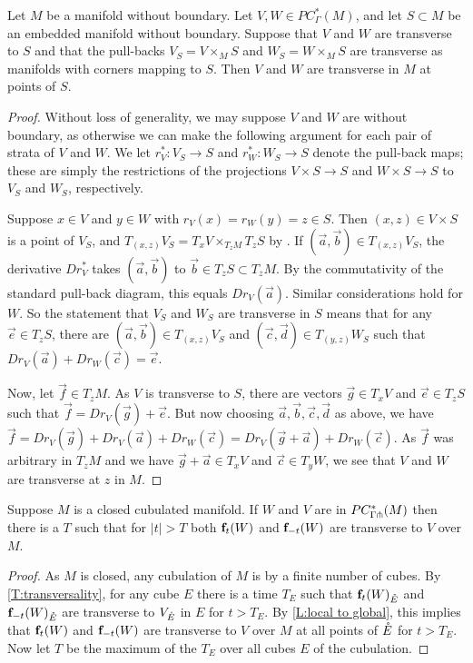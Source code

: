 \begin{lemma}\label{L:local to global}
	Let $M$ be a manifold without boundary.
	Let $V, W \in PC^*_\Gamma(M)$, and let $S \subset M$ be an embedded manifold without boundary.
	Suppose that $V$ and $W$ are transverse to $S$ and that the pull-backs $V_S = V \times_M S$ and $W_S = W \times_M S$ are transverse as manifolds with corners mapping to $S$.
	Then $V$ and $W$ are transverse in $M$ at points of $S$.
\end{lemma}
\begin{proof}
	Without loss of generality, we may suppose $V$ and $W$ are without boundary, as otherwise we can make the following argument for each pair of strata of $V$ and $W$.
	We let $r_V^* \colon V_S \to S$ and $r_W^* \colon W_S \to S$ denote the pull-back maps; these are simply the restrictions of the projections $V \times S \to S$ and $W \times S \to S$ to $V_S$ and $W_S$, respectively.

	Suppose $x \in V$ and $y \in W$ with $r_V(x) = r_W(y) = z \in S$.
	Then $(x,z) \in V \times S$ is a point of $V_S$, and $T_{(x,z)}V_S = T_xV \times_{T_zM} T_zS$ by \cite[Lemma 2.28]{medina2022foundations}.
	If $(\vec a,\vec b) \in T_{(x,z)}V_S$, the derivative $Dr_V^*$ takes $(\vec a,\vec b)$ to $\vec b \in T_z S \subset T_zM$.
	By the commutativity of the standard pull-back diagram, this equals $Dr_V(\vec a)$.
	Similar considerations hold for $W$.
	So the statement that $V_S$ and $W_S$ are transverse in $S$ means that for any $\vec e \in T_z S$, there are $(\vec a,\vec b) \in T_{(x,z)}V_S$ and $(\vec c,\vec d) \in T_{(y,z)}W_S$ such that $Dr_V(\vec a) + Dr_W(\vec c) = \vec e$.

	Now, let $\vec f \in T_z M$.
	As $V$ is transverse to $S$, there are vectors $\vec g \in T_x V$ and $\vec e \in T_z S$ such that $\vec f = Dr_V(\vec g) + \vec e$.
	But now choosing $\vec a,\vec b,\vec c,\vec d$ as above, we have $\vec f = Dr_V(\vec g) + Dr_V(\vec a) + Dr_W(\vec c) = Dr_V(\vec g + \vec a) +Dr_W(\vec c)$.
	As $\vec f$ was arbitrary in $T_zM$ and we have $\vec g + \vec a \in T_x V$ and $\vec c \in T_y W$, we see that $V$ and $W$ are transverse at $z$ in $M$.
\end{proof}

\begin{corollary}
	Suppose $M$ is a closed cubulated manifold.
	If $W$ and $V$ are in $PC_{\Gamma \pitchfork}^*(M)$ then there is a $T$ such that for $|t|>T$ both $\mathbf{f}_t(W)$ and $\mathbf{f}_{-t}(W)$ are transverse to $V$ over $M$.
\end{corollary}
\begin{proof}
	As $M$ is closed, any cubulation of $M$ is by a finite number of cubes.
	By \cref{T:transversality}, for any cube $E$ there is a time $T_E$ such that $\mathbf{f}_t(W)_{\mathring{E}}$ and $\mathbf{f}_{-t}(W)_{\mathring{E}}$ are transverse to $V_{\mathring{E}}$ in $E$ for $t > T_E$.
	By \cref{L:local to global}, this implies that $\mathbf{f}_t(W)$ and $\mathbf{f}_{-t}(W)$ are transverse to $V$ over $M$ at all points of $\mathring{E}$ for $t > T_E$.
	Now let $T$ be the maximum of the $T_E$ over all cubes $E$ of the cubulation.
\end{proof}

